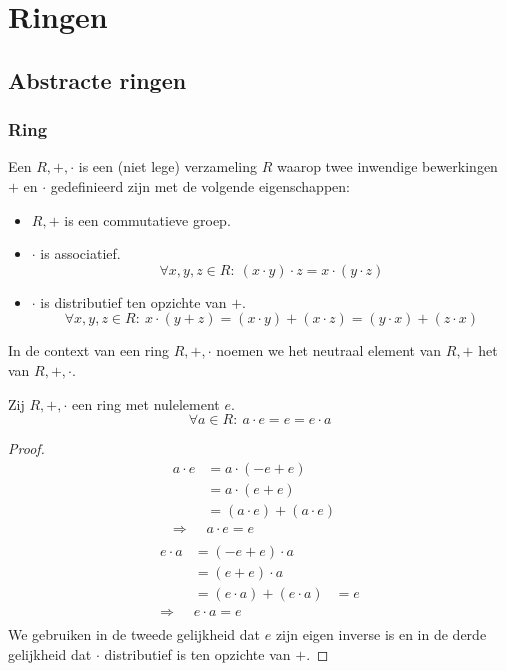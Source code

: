 \documentclass[main.tex]{subfiles}
\begin{document}
\chapter{Ringen}
\label{cha:ringen}

\section{Abstracte ringen}
\label{sec:abstracte-ringen}

\subsection{Ring}
\label{sec:ring}

\begin{de}
  Een  $R,+,\cdot$ is een (niet lege) verzameling $R$ waarop twee inwendige bewerkingen $+$ en $\cdot$ gedefinieerd zijn met de volgende eigenschappen:
  \begin{itemize}
  \item $R,+$ is een commutatieve groep.
  \item $\cdot$ is associatief.
    \[ \forall x,y,z \in R:\ (x\cdot y) \cdot z = x \cdot (y \cdot z) \]
  \item $\cdot$ is distributief ten opzichte van $+$.
    \[ \forall x,y,z \in R:\ x\cdot (y + z) = (x \cdot y) + (x \cdot z) = (y \cdot x) + (z \cdot x) \]
  \end{itemize}
\end{de}

\begin{de}
  In de context van een ring $R,+,\cdot$ noemen we het neutraal element van $R,+$ het  van $R,+,\cdot$.
\end{de}

\begin{ei}
  \label{ei:nulelement-opslorpend}
  Zij $R,+,\cdot$ een ring met nulelement $e$.
  \[ \forall a \in R:\ a \cdot e = e = e \cdot a \]

  \begin{proof}
    \[
    \begin{array}{rll}
      a \cdot e &= a \cdot (-e+e) &\\
                &= a \cdot (e+e) &\\
                &= (a \cdot e) + (a \cdot e)\\
      \Rightarrow & a \cdot e = e\\
    \end{array}
    \]
    \[
    \begin{array}{rll}
      e \cdot a &= (-e+e) \cdot a &\\
                &= (e+e) \cdot a &\\
                &= (e \cdot a) + (e \cdot a) &= e\\
      \Rightarrow & e \cdot a = e\\
    \end{array}
    \]
    We gebruiken in de tweede gelijkheid dat $e$ zijn eigen inverse is en in de derde gelijkheid dat $\cdot$ distributief is ten opzichte van $+$.
  \end{proof}
\end{ei}
\end{document}
